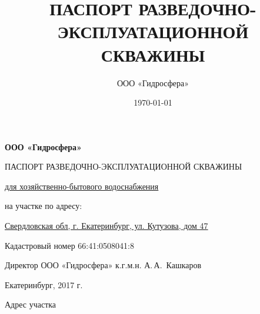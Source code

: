 \documentclass[a4paper,12pt]{article} %
\author{ООО «Гидросфера»}\label{company}
\title{ПАСПОРТ РАЗВЕДОЧНО-ЭКСПЛУАТАЦИОННОЙ СКВАЖИНЫ}
\date{\today}
\newcommand{\txtExecutor}{ООО «Гидросфера»}
\newcommand{\txtAddress}{Свердловская обл, г. Екатеринбург, ул. Кутузова, дом 47}
\newcommand{\txtCadaster}{66:41:0508041:8}
\begin{document}


\begin{titlepage}
	\begin{center}
		\textbf{\txtExecutor}
		\vspace{5.5cm}
		
		{\LARGE ПАСПОРТ РАЗВЕДОЧНО-ЭКСПЛУАТАЦИОННОЙ СКВАЖИНЫ}
		\vspace{0.25cm}
		
		\underline{для хозяйственно-бытового водоснабжения}
		
		\bigskip
		
		на участке по адресу:
				
		\underline{\txtAddress}
		
		Кадастровый номер \txtCadaster
		
		\vfill
	
		\bigskip
		
	\end{center}

	\vfill
	
	\newlength{\ML}
	\hfill\begin{minipage}{1.0\textwidth}
		Директор ООО «Гидросфера» к.г.м.н.
		\underline{\hspace{\ML}} А.\,А.~Кашкаров\\
	\end{minipage}%
	\bigskip
	

	\vfill
	
	\begin{center}
		Екатеринбург, 2017 г.
	\end{center}
\end{titlepage}


	\maketitle
	
	Адрес участка 
\end{document}
